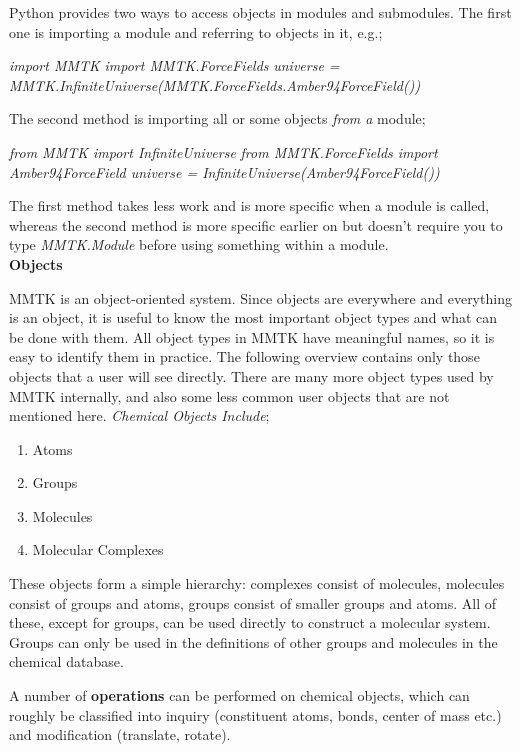 \documentclass{article}
\begin{document}
Python provides two ways to access objects in modules and submodules.
The first one is importing a module and referring to objects in it, e.g.;

\textit{import MMTK} 
\textit{import MMTK.ForceFields} 
\textit{universe = MMTK.InfiniteUniverse(MMTK.ForceFields.Amber94ForceField())} 

The second method is importing all or some objects \textit{from a} module; 

\textit{from MMTK import InfiniteUniverse}
\textit{from MMTK.ForceFields import Amber94ForceField
universe = InfiniteUniverse(Amber94ForceField())}

The first method takes less work and is more specific when a module is called, whereas the second method is more specific earlier on but doesn't require you to type \textit{MMTK.Module} before using something within a module. \\

\textbf{Objects}

MMTK is an object-oriented system.  Since objects are everywhere and everything is an object, it is useful to know the most important object types and what can be done with them.  All object types in MMTK have meaningful names, so it is easy to identify them in practice.  The following overview contains only those objects that a user will see directly. There are many more object types used by MMTK internally, and also some less common user objects that are not mentioned here. \textit{Chemical Objects Include}; 

\begin{enumerate}
    \item Atoms
    \item Groups
    \item Molecules
    \item Molecular Complexes
\end{enumerate}

These objects form a simple hierarchy:  complexes consist of molecules, molecules consist of groups and atoms, groups consist of smaller groups and atoms.  All of these, except for groups, can be used directly to construct a molecular system.  Groups can only be used in the definitions of other groups and molecules in the chemical database.

A number of \textbf{operations} can be performed on chemical objects, which can roughly be classified into inquiry (constituent atoms, bonds, center of mass etc.)  and modification (translate, rotate).
\end{document}
